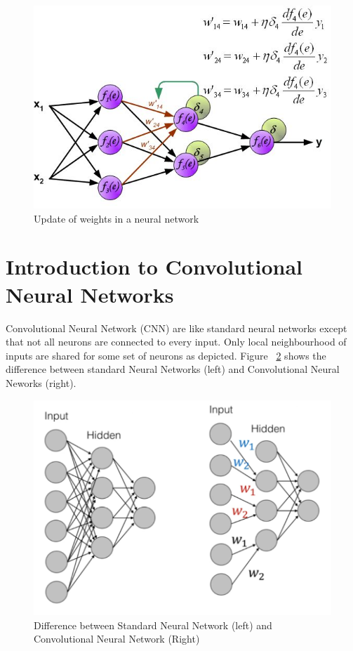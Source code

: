 \begin{enumerate}
\begin{figure}[H]
	\centering
   \includegraphics[scale=0.66]{figures/intro/weight_update.bmp}
   \caption[Weight Update]{Update of weights in a neural network}
   \label{fig:weight_update}
\end{figure}


\end{enumerate}

\section{Introduction to Convolutional Neural Networks}

Convolutional Neural Network (CNN) are like standard neural networks except that not all neurons are connected to every input. 
Only local neighbourhood of inputs are shared for some set of neurons as depicted. Figure ~\ref{fig:cnn} shows the difference between standard Neural Networks (left) and Convolutional Neural Neworks (right).

\begin{figure}[H]
	\centering
   \includegraphics[scale=0.46]{figures/intro/cnn.png}
   \caption[Convolutional Neural Network]{Difference between Standard Neural Network (left) and Convolutional Neural Network (Right)}
   \label{fig:cnn}
\end{figure}

